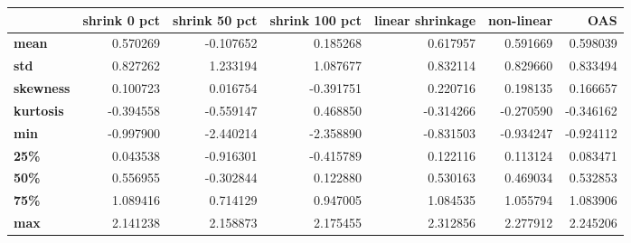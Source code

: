 \begin{tabular}{lrrrrrr}
\toprule
{} &  shrink 0 pct &  shrink 50 pct &  shrink 100 pct &  linear shrinkage &  non-linear &       OAS \\
\midrule
\textbf{mean    } &      0.570269 &      -0.107652 &        0.185268 &          0.617957 &    0.591669 &  0.598039 \\
\textbf{std     } &      0.827262 &       1.233194 &        1.087677 &          0.832114 &    0.829660 &  0.833494 \\
\textbf{skewness} &      0.100723 &       0.016754 &       -0.391751 &          0.220716 &    0.198135 &  0.166657 \\
\textbf{kurtosis} &     -0.394558 &      -0.559147 &        0.468850 &         -0.314266 &   -0.270590 & -0.346162 \\
\textbf{min     } &     -0.997900 &      -2.440214 &       -2.358890 &         -0.831503 &   -0.934247 & -0.924112 \\
\textbf{25\%     } &      0.043538 &      -0.916301 &       -0.415789 &          0.122116 &    0.113124 &  0.083471 \\
\textbf{50\%     } &      0.556955 &      -0.302844 &        0.122880 &          0.530163 &    0.469034 &  0.532853 \\
\textbf{75\%     } &      1.089416 &       0.714129 &        0.947005 &          1.084535 &    1.055794 &  1.083906 \\
\textbf{max     } &      2.141238 &       2.158873 &        2.175455 &          2.312856 &    2.277912 &  2.245206 \\
\bottomrule
\end{tabular}
